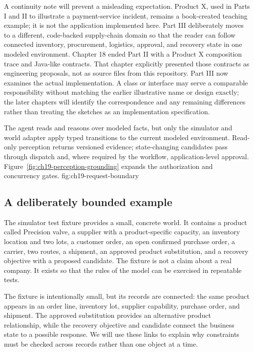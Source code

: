 A continuity note will prevent a misleading expectation. Product X, used in Parts I and II to illustrate a payment-service incident, remains a book-created teaching example; it is not the application implemented here. Part III deliberately moves to a different, code-backed supply-chain domain so that the reader can follow connected inventory, procurement, logistics, approval, and recovery state in one modeled environment. Chapter 18 ended Part II with a Product X composition trace and Java-like contracts. That chapter explicitly presented those contracts as engineering proposals, not as source files from this repository. Part III now examines the actual implementation. A class or interface may serve a comparable responsibility without matching the earlier illustrative name or design exactly; the later chapters will identify the correspondence and any remaining differences rather than treating the sketches as an implementation specification.

  {The agent reads and reasons over modeled facts, but only the simulator and world adapter apply typed transitions to the current modeled environment. Read-only perception returns versioned evidence; state-changing candidates pass through dispatch and, where required by the workflow, application-level approval. Figure~\ref{fig:ch19-perception-grounding} expands the authorization and concurrency gates.}
  {fig:ch19-request-boundary}

\subsection{A deliberately bounded example}

\BookExampleLabel{} The simulator test fixture provides a small, concrete world. It contains a product called Precision valve, a supplier with a product-specific capacity, an inventory location and two lots, a customer order, an open confirmed purchase order, a carrier, two routes, a shipment, an approved product substitution, and a recovery objective with a proposed candidate. The fixture is not a claim about a real company. It exists so that the rules of the model can be exercised in repeatable tests.

The fixture is intentionally small, but its records are connected: the same product appears in an order line, inventory lot, supplier capability, purchase order, and shipment. The approved substitution provides an alternative product relationship, while the recovery objective and candidate connect the business state to a possible response. We will use these links to explain why constraints must be checked across records rather than one object at a time.

